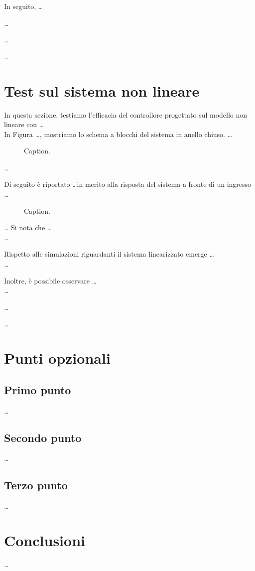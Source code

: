 \documentclass[a4paper, 11pt]{article}
\begin{document}
In seguito, \dots

\dots

\dots

\dots

\section{Test sul sistema non lineare}

In questa sezione, testiamo l'efficacia del controllore progettato sul modello non lineare con \dots \\

In Figura \dots, mostriamo lo schema a blocchi del sistema in anello chiuso. \dots

\begin{figure}[h]
    \centering
    \caption{Caption.}
    \label{fig:bode_diagram_L}
\end{figure}

\dots

Di seguito è riportato \dots in merito alla risposta del sistema a fronte di un ingresso \dots

\begin{figure}[h]
    \centering
    \caption{Caption.}
    \label{fig:bode_diagram_L}
\end{figure}

\dots
Si nota che \dots\\

\dots

Rispetto alle simulazioni riguardanti il sistema linearizzato emerge \dots\\

\dots

Inoltre, è possibile osservare \dots\\

\dots

\dots

\dots


\section{Punti opzionali}

\subsection{Primo punto}

\dots 

\subsection{Secondo punto}

\dots

\subsection{Terzo punto}

\dots

\section{Conclusioni}

\dots
\end{document}

